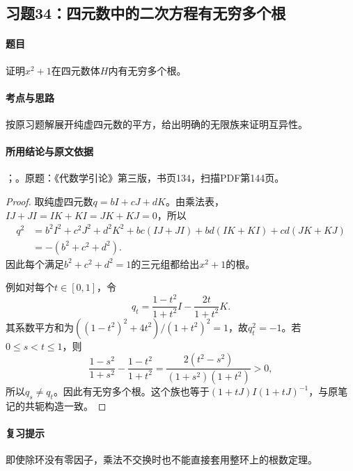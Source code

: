 \subsection{习题34：四元数中的二次方程有无穷多个根}

\label{ex:3:34}

\paragraph{题目}

证明$x^2+1$在四元数体$H$内有无穷多个根。

\paragraph{考点与思路}

按原习题解展开纯虚四元数的平方，给出明确的无限族来证明互异性。

\paragraph{所用结论与原文依据}

；。原题：《代数学引论》第三版，书页134，扫描PDF第144页。


\begin{proof}

取纯虚四元数$q=bI+cJ+dK$。由乘法表，$IJ+JI=IK+KI=JK+KJ=0$，所以
\begin{align*}
q^2&=b^2I^2+c^2J^2+d^2K^2
+bc(IJ+JI)+bd(IK+KI)+cd(JK+KJ)\\
&=-(b^2+c^2+d^2).
\end{align*}
因此每个满足$b^2+c^2+d^2=1$的三元组都给出$x^2+1$的根。

例如对每个$t\in[0,1]$，令
\[
q_t=\frac{1-t^2}{1+t^2}I-\frac{2t}{1+t^2}K.
\]
其系数平方和为$((1-t^2)^2+4t^2)/(1+t^2)^2=1$，故$q_t^2=-1$。若$0\le s<t\le1$，则
\[
\frac{1-s^2}{1+s^2}-\frac{1-t^2}{1+t^2}
=\frac{2(t^2-s^2)}{(1+s^2)(1+t^2)}>0,
\]
所以$q_s\ne q_t$。因此有无穷多个根。这个族也等于$(1+tJ)I(1+tJ)^{-1}$，与原笔记的共轭构造一致。

\end{proof}

\paragraph{复习提示}

即使除环没有零因子，乘法不交换时也不能直接套用整环上的根数定理。



